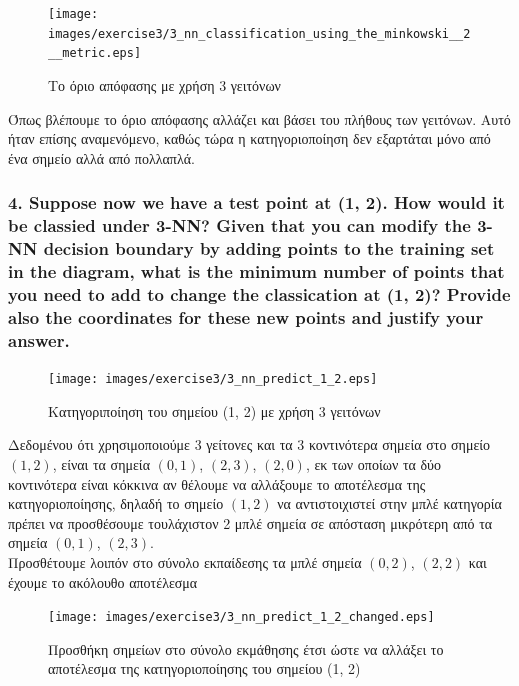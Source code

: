 \documentclass[12pt]{article}
\newenvironment{matlab}
	{\begin{figure}[H]\centering\captionsetup{justification=centering}}
	{\end{figure}}
\begin{document}
\begin{matlab}
    \texttt{[image: images/exercise3/3\_nn\_classification\_using\_the\_minkowski\_\_2\_\_metric.eps]}
    \caption{Το όριο απόφασης με χρήση 3 γειτόνων}
\end{matlab}

Όπως βλέπουμε το όριο απόφασης αλλάζει και βάσει του πλήθους των γειτόνων.
Αυτό ήταν επίσης αναμενόμενο, καθώς τώρα η κατηγοριοποίηση δεν εξαρτάται
μόνο από ένα σημείο αλλά από πολλαπλά. \\

\pagebreak

\subsubsection*{4. Suppose now we have a test point at (1, 2). How would it be classied under 3-NN? Given
that you can modify the 3-NN decision boundary by adding points to the training set in
the diagram, what is the minimum number of points that you need to add to change the
classication at (1, 2)? Provide also the coordinates for these new points and justify your
answer.}

\begin{matlab}
    \texttt{[image: images/exercise3/3\_nn\_predict\_1\_2.eps]}
    \caption{Κατηγοριποίηση του σημείου (1, 2) με χρήση 3 γειτόνων}
\end{matlab}

Δεδομένου ότι χρησιμοποιούμε 3 γείτονες και τα 3 κοντινότερα σημεία στο σημείο
\( (1, 2) \), είναι τα σημεία \( (0, 1) \), \( (2, 3) \), \( (2, 0) \),
εκ των οποίων τα δύο κοντινότερα είναι κόκκινα αν θέλουμε να αλλάξουμε το αποτέλεσμα της
κατηγοριοποίησης, δηλαδή το σημείο \( (1, 2) \) να αντιστοιχιστεί στην μπλέ
κατηγορία πρέπει να προσθέσουμε τουλάχιστον 2 μπλέ σημεία σε απόσταση μικρότερη
από τα σημεία \( (0, 1) \), \( (2, 3) \). \\

Προσθέτουμε λοιπόν στο σύνολο εκπαίδεσης τα μπλέ σημεία
\( (0, 2) \), \( (2, 2) \) και έχουμε το ακόλουθο αποτέλεσμα

\begin{matlab}
    \texttt{[image: images/exercise3/3\_nn\_predict\_1\_2\_changed.eps]}
    \caption{Προσθήκη σημείων στο σύνολο εκμάθησης έτσι ώστε να αλλάξει το αποτέλεσμα της κατηγοριοποίησης του σημείου (1, 2)}
\end{matlab}
\end{document}
